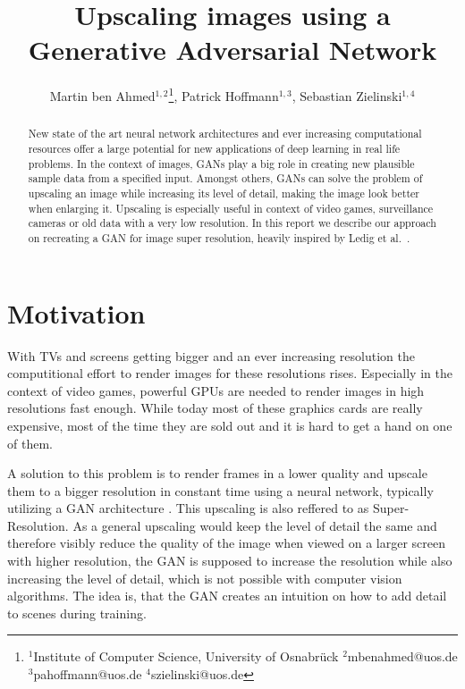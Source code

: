 \documentclass[11pt,twocolumn,twoside,paper=a4]{IEEEtran}
\begin{document}
\title{\vspace{0.2in}\sc Upscaling images using a Generative Adversarial Network}
\author{Martin ben Ahmed$^{1,2}$\thanks{$^1$Institute of Computer Science, University of Osnabrück $^2$mbenahmed@uos.de $^3$pahoffmann@uos.de $^4$szielinski@uos.de}, Patrick Hoffmann$^{1,3}$, Sebastian Zielinski$^{1,4}$}

\maketitle
\thispagestyle{fancy}
\begin{abstract}
New state of the art neural network architectures and ever increasing computational resources
offer a large potential for new applications of deep learning in real life problems.
In the context of images, GANs play a big role in creating new plausible sample data from a specified input.
Amongst others, GANs can solve the problem of upscaling an image while increasing its level of detail, making the image look better when enlarging it. Upscaling is especially useful in context of video games, surveillance cameras or old data with a very low resolution.
In this report we describe our approach on recreating a GAN for image super resolution, heavily
inspired by Ledig et al.~\cite{DBLP:journals/corr/LedigTHCATTWS16}.
\end{abstract}

\section{Motivation}

With TVs and screens getting bigger and an ever increasing resolution the computitional effort to render images for these resolutions rises. Especially in the context of video games, powerful GPUs are needed to render images in high resolutions fast enough. While today most of these graphics cards are really expensive, most of the time they are sold out and it is hard to get a hand on one of them.

A solution to this problem is to render frames in a lower quality and upscale them to a bigger resolution in constant time using a neural network, typically utilizing a GAN architecture \cite{watson2020deep}.
This upscaling is also reffered to as Super-Resolution.
As a general upscaling would keep the level of detail the same and therefore visibly reduce the quality of the image when viewed on a larger screen with higher resolution, the GAN is supposed to increase the resolution while also increasing the level of detail, which is not possible with computer vision algorithms.
The idea is, that the GAN creates an intuition on how to add detail to scenes during training.
\end{document}
